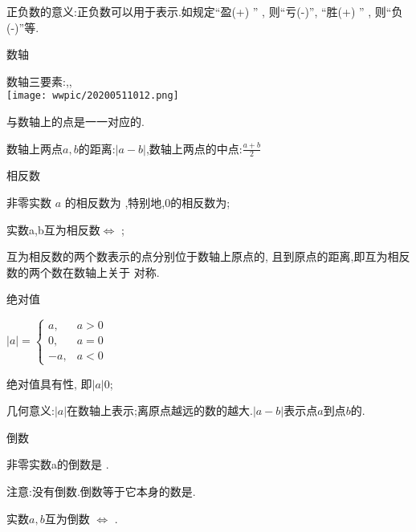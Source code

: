 \documentclass[cn,blue,12pt]{elegantbook}
\begin{document}
\begin{zsyd}
\begin{zsyd}
    \end{zsyd}
\item 正负数的意义:正负数可以用于表示.如规定``盈(+) '' , 则``亏(-)'', ``胜(+) '' , 则``负(-)''等.
\item 数轴
    \begin{zsyd}
    \item 数轴三要素:,,\\
            \texttt{[image: wwpic/20200511012.png]}
    \item {}与数轴上的点是一一对应的.
    \item 数轴上两点\(a,b\)的距离:\(|a-b|\),数轴上两点的中点:\(\frac{a+b}{2}\)
    \end{zsyd}
\item 相反数
    \begin{zsyd}
    \item 非零实数 \(a\) 的相反数为  ,特别地,\(0\)的相反数为;
    \item 实数a,b互为相反数\(\iff \)  ;
    \item 互为相反数的两个数表示的点分别位于数轴上原点的, 且到原点的距离,即互为相反数的两个数在数轴上关于  对称.
    \end{zsyd}
\item 绝对值
    \begin{zsyd}
    \item \(|a|=\)\( \begin{cases} a, & a>0\\ 0, & a=0\\ -a, & a<0 \end{cases} \)
    \item 绝对值具有性, 即\(|a|\)\tkt{ \(\ge \)}\(0\);
    \item 几何意义:\(|a|\)在数轴上表示;离原点越远的数的越大.\(|a-b|\)表示点\(a\)到点\(b\)的.
    \end{zsyd}
\item 倒数
    \begin{zsyd}
    \item 非零实数a的倒数是  .
    \item 注意:没有倒数.倒数等于它本身的数是.
    \item 实数\(a, b\)互为倒数 \(\iff\) .
    \end{zsyd}


\end{zsyd}
\end{document}
